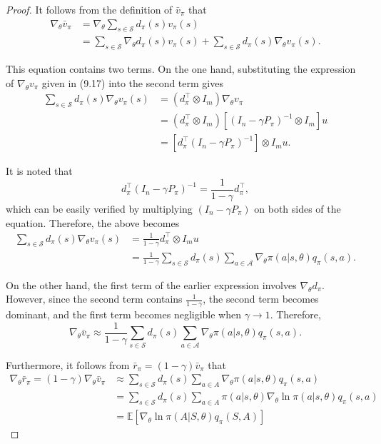 \documentclass[10pt]{elegantbook}
\begin{document}
\begin{proof}
    It follows from the definition of $\bar{v}_{\pi}$ that
    \[
    \begin{aligned}
        \nabla_{\theta} \bar{v}_{\pi} &= \nabla_{\theta} \sum_{s \in \mathcal{S}} d_{\pi}(s) v_{\pi}(s) \\
        &= \sum_{s \in \mathcal{S}} \nabla_{\theta} d_{\pi}(s) v_{\pi}(s) + \sum_{s \in \mathcal{S}} d_{\pi}(s) \nabla_{\theta} v_{\pi}(s).
    \end{aligned}
    \]

    This equation contains two terms. On the one hand, substituting the expression of $\nabla_{\theta} v_{\pi}$ given in (9.17) into the second term gives
    \[
    \begin{aligned}
        \sum_{s \in \mathcal{S}} d_{\pi}(s) \nabla_{\theta} v_{\pi}(s)
        &= \left( d_{\pi}^{\top} \otimes I_m \right) \nabla_{\theta} v_{\pi} \\
        &= \left( d_{\pi}^{\top} \otimes I_m \right) \left[ (I_n - \gamma P_{\pi})^{-1} \otimes I_m \right] u \\
        &= \left[ d_{\pi}^{\top} (I_n - \gamma P_{\pi})^{-1} \right] \otimes I_m u.
    \end{aligned}
    \]

    It is noted that
    \[
    d_{\pi}^{\top} (I_n - \gamma P_{\pi})^{-1} = \frac{1}{1 - \gamma} d_{\pi}^{\top},
    \]
    which can be easily verified by multiplying $(I_n - \gamma P_{\pi})$ on both sides of the equation. Therefore, the above becomes
    \[
    \begin{aligned}
        \sum_{s \in \mathcal{S}} d_{\pi}(s) \nabla_{\theta} v_{\pi}(s)
        &= \frac{1}{1 - \gamma} d_{\pi}^{\top} \otimes I_m u \\
        &= \frac{1}{1 - \gamma} \sum_{s \in \mathcal{S}} d_{\pi}(s) \sum_{a \in \mathcal{A}} \nabla_{\theta} \pi(a|s, \theta) q_{\pi}(s, a).
    \end{aligned}
    \]

    On the other hand, the first term of the earlier expression involves $\nabla_{\theta} d_{\pi}$. However, since the second term contains $\frac{1}{1 - \gamma}$, the second term becomes dominant, and the first term becomes negligible when $\gamma \to 1$. Therefore,
    \[
    \nabla_{\theta} \bar{v}_{\pi} \approx \frac{1}{1 - \gamma} \sum_{s \in \mathcal{S}} d_{\pi}(s) \sum_{a \in \mathcal{A}} \nabla_{\theta} \pi(a|s, \theta) q_{\pi}(s, a).
    \]

    Furthermore, it follows from $\bar{r}_{\pi} = (1 - \gamma) \bar{v}_{\pi}$ that
    \[
    \begin{aligned}
        \nabla_{\theta}\bar{r}_{\pi}=(1-\gamma)\nabla_{\theta}\bar{v}_{\pi} &\approx 
        \sum_{s\in{\mathcal{S}}}d_{\pi}(s)\sum_{a\in A}\nabla_{\theta}\pi(a|s,\theta)q_{\pi}(s,a) \\
        &= \sum_{s\in{\mathcal{S}}}d_{\pi}(s)\sum_{a\in A} \pi(a|s,\theta) \nabla_{\theta}\ln \pi(a|s,\theta)q_{\pi}(s,a) \\
        &= \mathbb{E}\left[\nabla_{\theta}\ln\pi(A|S,\theta)q_{\pi}(S,A)\right]
    \end{aligned}
    \]
\end{proof}
\end{document}
